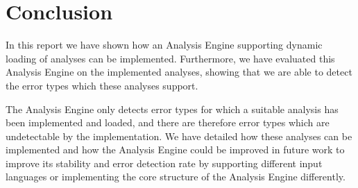 \section{Conclusion}

In this report we have shown how an Analysis Engine supporting dynamic loading of analyses can be implemented. Furthermore, we have evaluated this Analysis Engine on the implemented analyses, showing that we are able to detect the error types which these analyses support. 

\newpar The Analysis Engine only detects error types for which a suitable analysis has been implemented and loaded, and there are therefore error types which are undetectable by the implementation. We have detailed how these analyses can be implemented and how the Analysis Engine could be improved in future work to improve its stability and error detection rate by supporting different input languages or implementing the core structure of the Analysis Engine differently.